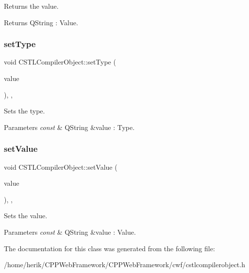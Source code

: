 Returns the value. 

\begin{DoxyReturn}{Returns}
Q\+String \+: Value. 
\end{DoxyReturn}
\mbox{\label{class_c_s_t_l_compiler_object_aa085b545107f3a4a6a06e73353e30b5b}} 
\subsubsection{\texorpdfstring{set\+Type}{setType}}
{\footnotesize\ttfamily void C\+S\+T\+L\+Compiler\+Object\+::set\+Type (\begin{DoxyParamCaption}\item[{const Q\+String \&}]{value }\end{DoxyParamCaption})\hspace{0.3cm}{\ttfamily [inline]}, {\ttfamily [slot]}, {\ttfamily [noexcept]}}



Sets the type. 


\begin{DoxyParams}{Parameters}
{\em const} & Q\+String \&value \+: Type. \\
\hline
\end{DoxyParams}
\mbox{\label{class_c_s_t_l_compiler_object_ad16e7e9c49e97375c6af683f94c550d2}} 
\subsubsection{\texorpdfstring{set\+Value}{setValue}}
{\footnotesize\ttfamily void C\+S\+T\+L\+Compiler\+Object\+::set\+Value (\begin{DoxyParamCaption}\item[{const Q\+String \&}]{value }\end{DoxyParamCaption})\hspace{0.3cm}{\ttfamily [inline]}, {\ttfamily [slot]}, {\ttfamily [noexcept]}}



Sets the value. 


\begin{DoxyParams}{Parameters}
{\em const} & Q\+String \&value \+: Value. \\
\hline
\end{DoxyParams}


The documentation for this class was generated from the following file\+:\begin{DoxyCompactItemize}
\item 
/home/herik/\+C\+P\+P\+Web\+Framework/\+C\+P\+P\+Web\+Framework/cwf/cstlcompilerobject.\+h\end{DoxyCompactItemize}
